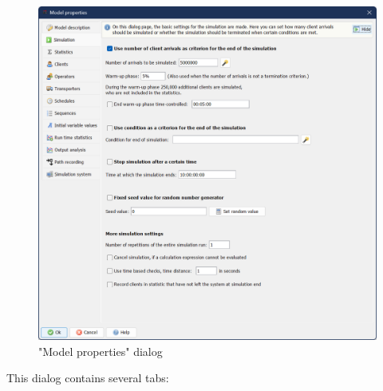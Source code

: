 \documentclass{svmono}
\begin{document}
\begin{figure}[H]	
	\caption{"Model properties" dialog}
	\centerline{\includegraphics[width=14cm]{DialogModel.png}}
	\label{fig:DialogModel}
\end{figure} 

This dialog contains several tabs:
\end{document}
